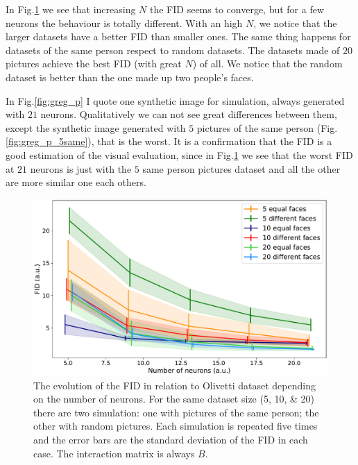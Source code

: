 \documentclass[a4paper,12pt]{article}
\begin{document}
In Fig.\ref{fig:greg_g} we see that increasing $N$ the FID seems to converge, but for a few neurons the behaviour is totally different.
With an high $N$, we notice that the larger datasets have a better FID than smaller ones.
The same thing happens for datasets of the same person respect to random datasets.
The datasets made of $20$ pictures achieve the best FID (with great $N$) of all.
We notice that the random dataset is better than the one made up two people's faces.

In Fig.\ref{fig:greg_p} I quote one synthetic image for simulation, always generated with $21$ neurons.
Qualitatively we can not see great differences between them, except the synthetic image generated with $5$ pictures of the same person (Fig.\ref{fig:greg_p_5same}), that is the worst.
It is a confirmation that the FID is a good estimation of the visual evaluation, since in Fig.\ref{fig:greg_g} we see that the worst FID at $21$ neurons is just with the $5$ same person pictures dataset and all the other are more similar one each others.

\begin{figure}[!htbp]
  \centering
  \includegraphics[width=.9\columnwidth]{greg.pdf}
  \caption[FID changing dataset size]{The evolution of the FID in relation to Olivetti dataset depending on the number of neurons.
  For the same dataset size (\numlist{5;10;20}) there are two simulation: one with pictures of the same person; the other with random pictures.
  Each simulation is repeated five times and the error bars are the standard deviation of the FID in each case.
  The interaction matrix is always $B$.
  }
  \label{fig:greg_g}
\end{figure}
\end{document}
